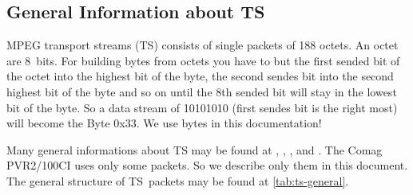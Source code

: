 \documentclass{scrartcl}
\newcommand*{\Comag}{Comag PVR2/100CI\xspace}
\begin{document}
\subsection{General Information about TS}
\label{sec:ts-general}

MPEG transport streams (TS) consists of single packets of 188 octets. An octet
are 8~bits. For building bytes from octets you have to but the first sended
bit of the octet into the highest bit of the byte, the second sendes bit into
the second highest bit of the byte and so on until the 8th sended bit will
stay in the lowest bit of the byte. So a data stream of 10101010 (first sendes
bit is the right most) will become the Byte 0x33. We use bytes in this
documentation!

Many general informations about TS may be found at \cite{iso13818-1},
\cite{iso13818-2}, \cite{iso13818-3}, and \cite{iso13818-4}. The \Comag uses
only some packets. So we describe only them in this document. The general
structure of TS~packets may be found at \autoref{tab:ts-general}.
\end{document}
